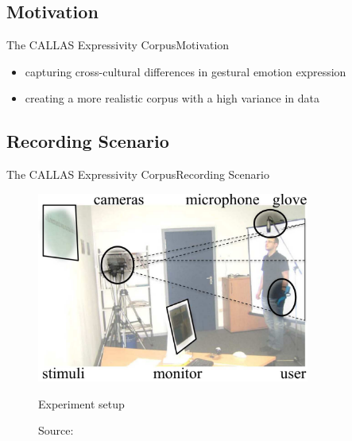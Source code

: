 \documentclass{beamer}
\begin{document}
			\subsection{Motivation}
				\begin{frame}{The CALLAS Expressivity Corpus}{Motivation}			
					\begin{itemize}
						\item capturing cross-cultural differences in gestural emotion expression
						\item creating a more realistic corpus with a high variance in data
					\end{itemize}											
				\end{frame}		
					
			\subsection{Recording Scenario}
				\begin{frame}{The CALLAS Expressivity Corpus}{Recording Scenario}																\begin{figure}
						\includegraphics[width=0.8\textwidth]{images/Callas/experimentSetup}
						\caption{Experiment setup}
						\vspace*{-10pt}
						\caption*{Source: \cite{2010MultimodalCorpusForGestureExpressivity}}
					\end{figure}
				\end{frame}
			
\end{document}
